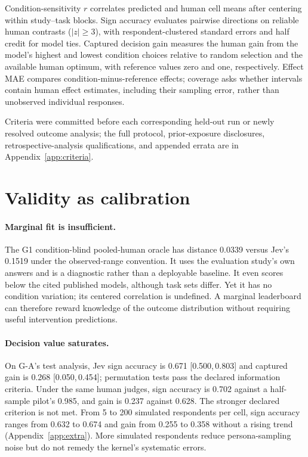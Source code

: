 \documentclass[11pt]{article}
\newcommand{\CI}[2]{[#1,\,#2]}
\begin{document}
Condition-sensitivity $r$ correlates predicted and human cell means after centering within study--task blocks.
Sign accuracy evaluates pairwise directions on reliable human contrasts ($|z|\geq3$), with respondent-clustered standard errors and half credit for model ties.
Captured decision gain measures the human gain from the model's highest and lowest condition choices relative to random selection and the available human optimum, with reference values zero and one, respectively.
Effect MAE compares condition-minus-reference effects; coverage asks whether intervals contain human effect estimates, including their sampling error, rather than unobserved individual responses.

Criteria were committed before each corresponding held-out run or newly resolved outcome analysis; the full protocol, prior-exposure disclosures, retrospective-analysis qualifications, and appended errata are in Appendix~\ref{app:criteria}.

\section{Validity as calibration}
\paragraph{Marginal fit is insufficient.}
The G1 condition-blind pooled-human oracle has distance 0.0339 versus Jev's 0.1519 under the observed-range convention. It uses the evaluation study's own answers and is a diagnostic rather than a deployable baseline. It even scores below the cited published models, although task sets differ. Yet it has no condition variation; its centered correlation is undefined. A marginal leaderboard can therefore reward knowledge of the outcome distribution without requiring useful intervention predictions.

\paragraph{Decision value saturates.}
On G-A's test analysis, Jev sign accuracy is 0.671 \CI{0.500}{0.803} and captured gain is 0.268 \CI{0.050}{0.454}; permutation tests pass the declared information criteria. Under the same human judges, sign accuracy is 0.702 against a half-sample pilot's 0.985, and gain is 0.237 against 0.628. The stronger declared criterion is not met. From 5 to 200 simulated respondents per cell, sign accuracy ranges from 0.632 to 0.674 and gain from 0.255 to 0.358 without a rising trend (Appendix~\ref{app:extra}). More simulated respondents reduce persona-sampling noise but do not remedy the kernel's systematic errors.
\end{document}

